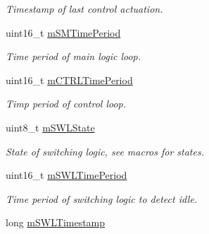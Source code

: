 \begin{DoxyCompactItemize}
\begin{DoxyCompactList}\small\item\em Timestamp of last control actuation. \end{DoxyCompactList}\item 
uint16\+\_\+t \hyperlink{classSPMB_1_1StateMachine_af09b596c6c80e052807b56779d14903d}{m\+S\+M\+Time\+Period}\hypertarget{classSPMB_1_1StateMachine_af09b596c6c80e052807b56779d14903d}{}\label{classSPMB_1_1StateMachine_af09b596c6c80e052807b56779d14903d}

\begin{DoxyCompactList}\small\item\em Time period of main logic loop. \end{DoxyCompactList}\item 
uint16\+\_\+t \hyperlink{classSPMB_1_1StateMachine_a57244a6945d6a7442f67563dea8f1754}{m\+C\+T\+R\+L\+Time\+Period}\hypertarget{classSPMB_1_1StateMachine_a57244a6945d6a7442f67563dea8f1754}{}\label{classSPMB_1_1StateMachine_a57244a6945d6a7442f67563dea8f1754}

\begin{DoxyCompactList}\small\item\em Timp period of control loop. \end{DoxyCompactList}\item 
uint8\+\_\+t \hyperlink{classSPMB_1_1StateMachine_a4ef617b6025ddafc0c3d033cb59935d7}{m\+S\+W\+L\+State}\hypertarget{classSPMB_1_1StateMachine_a4ef617b6025ddafc0c3d033cb59935d7}{}\label{classSPMB_1_1StateMachine_a4ef617b6025ddafc0c3d033cb59935d7}

\begin{DoxyCompactList}\small\item\em State of switching logic, see macros for states. \end{DoxyCompactList}\item 
uint16\+\_\+t \hyperlink{classSPMB_1_1StateMachine_a9736947bcb2c289d85c7588434fb93c8}{m\+S\+W\+L\+Time\+Period}\hypertarget{classSPMB_1_1StateMachine_a9736947bcb2c289d85c7588434fb93c8}{}\label{classSPMB_1_1StateMachine_a9736947bcb2c289d85c7588434fb93c8}

\begin{DoxyCompactList}\small\item\em Time period of switching logic to detect idle. \end{DoxyCompactList}\item 
long \hyperlink{classSPMB_1_1StateMachine_acd7bdae2efc3414abcf4e0eba1b3ac59}{m\+S\+W\+L\+Timestamp}\hypertarget{classSPMB_1_1StateMachine_acd7bdae2efc3414abcf4e0eba1b3ac59}{}\label{classSPMB_1_1StateMachine_acd7bdae2efc3414abcf4e0eba1b3ac59}


\end{DoxyCompactItemize}

